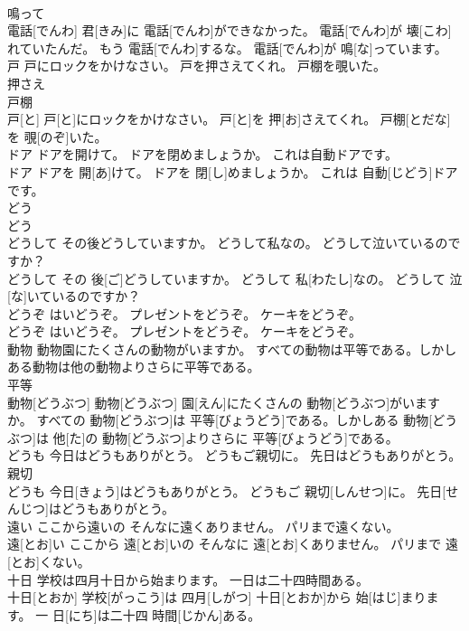 \documentclass[8pt]{extreport}
\begin{document}
\begin{CJK}{UTF8}{min}
\\	鳴って 
\\	電話[でんわ] 君[きみ]に 電話[でんわ]ができなかった。 電話[でんわ]が 壊[こわ]れていたんだ。 もう 電話[でんわ]するな。 電話[でんわ]が 鳴[な]っています。
\\	戸 戸にロックをかけなさい。 戸を押さえてくれ。 戸棚を覗いた。	
\\	押さえ 
\\	戸棚 
\\	戸[と] 戸[と]にロックをかけなさい。 戸[と]を 押[お]さえてくれ。 戸棚[とだな]を 覗[のぞ]いた。
\\	ドア ドアを開けて。 ドアを閉めましょうか。 これは自動ドアです。	
\\	ドア ドアを 開[あ]けて。 ドアを 閉[し]めましょうか。 これは 自動[じどう]ドアです。
\\	どう	
\\	どう
\\	どうして その後どうしていますか。 どうして私なの。 どうして泣いているのですか？	
\\	どうして その 後[ご]どうしていますか。 どうして 私[わたし]なの。 どうして 泣[な]いているのですか？
\\	どうぞ はいどうぞ。 プレゼントをどうぞ。 ケーキをどうぞ。	
\\	どうぞ はいどうぞ。 プレゼントをどうぞ。 ケーキをどうぞ。
\\	動物 動物園にたくさんの動物がいますか。 すべての動物は平等である。しかしある動物は他の動物よりさらに平等である。	
\\	平等 
\\	動物[どうぶつ] 動物[どうぶつ] 園[えん]にたくさんの 動物[どうぶつ]がいますか。 すべての 動物[どうぶつ]は 平等[びょうどう]である。しかしある 動物[どうぶつ]は 他[た]の 動物[どうぶつ]よりさらに 平等[びょうどう]である。
\\	どうも 今日はどうもありがとう。 どうもご親切に。 先日はどうもありがとう。	
\\	親切 
\\	どうも 今日[きょう]はどうもありがとう。 どうもご 親切[しんせつ]に。 先日[せんじつ]はどうもありがとう。
\\	遠い ここから遠いの そんなに遠くありません。 パリまで遠くない。	
\\	遠[とお]い ここから 遠[とお]いの そんなに 遠[とお]くありません。 パリまで 遠[とお]くない。
\\	十日 学校は四月十日から始まります。 一日は二十四時間ある。	
\\	十日[とおか] 学校[がっこう]は 四月[しがつ] 十日[とおか]から 始[はじ]まります。 一 日[にち]は二十四 時間[じかん]ある。

\end{CJK}
\end{document}
